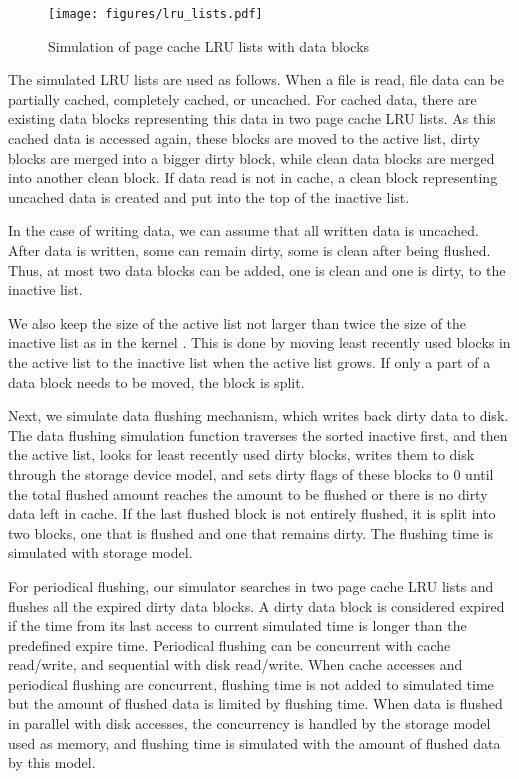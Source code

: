\documentclass[conference]{IEEEtran}
\begin{document}
			\begin{figure}
   				\centering
   				\texttt{[image: figures/lru\_lists.pdf]}
   				\caption{Simulation of page cache LRU lists with data blocks}\label{fig:lrulist}
			\end{figure}	
			
			The simulated LRU lists are used as follows. When a file is read, 
			file data can be partially cached, completely cached, or uncached. 
			For cached data, there are existing data blocks representing 
			this data in two page cache LRU lists. 
			As this cached data is accessed again, these blocks are moved to 
			the active list, dirty blocks are merged into a bigger dirty block, 
			while clean data blocks are merged into another clean block. 
			If data read is not in cache, a clean block representing uncached data 
			is created and put into the top of the inactive list. 
			
			In the case of writing data, we can assume that all written data 
			is uncached. After data is written, some can remain dirty, some is 
			clean after being flushed. 
			Thus, at most two data blocks can be added, one is clean and one 
			is dirty, to the inactive list.
			
			We also keep the size of the active list not larger than twice the size of 
			the inactive list as in the kernel 
			\cite{gorman2004understanding, linuxdev3rd2010}. 
			This is done by moving least recently used blocks in the active list 
			to the inactive list when the active list grows. If only a part of a data 
			block needs to be moved, the block is split.

			Next, we simulate data flushing mechanism, which writes back 
			dirty data to disk. 
			The data flushing simulation function traverses the sorted inactive first, 
			and then the active list, looks for least recently used dirty blocks, 
			writes them to disk through the storage device model, and 
			sets dirty flags of these blocks to 0 until the total flushed amount 
			reaches the amount to be flushed or there is no dirty data left in cache. 
			If the last flushed block is not entirely flushed, it is split into 
			two blocks, one that is flushed and one that remains dirty.
			The flushing time is simulated with storage model.
			
			For periodical flushing, our simulator searches in two page cache 
			LRU lists and flushes all the expired dirty data blocks. 
			A dirty data block is considered expired if the time from its last access 
			to current simulated time is longer than the predefined expire time. 
			Periodical flushing can be concurrent with cache read/write, 
			and sequential with disk read/write. When cache accesses and 
			periodical flushing are concurrent, flushing time is not added to simulated 
			time but the amount of flushed data is limited by flushing time. 
			When data is flushed in parallel with disk accesses, the concurrency 
			is handled by the storage model used as memory, and flushing time 
			is simulated with the amount of flushed data by this model. 
				
\end{document}
